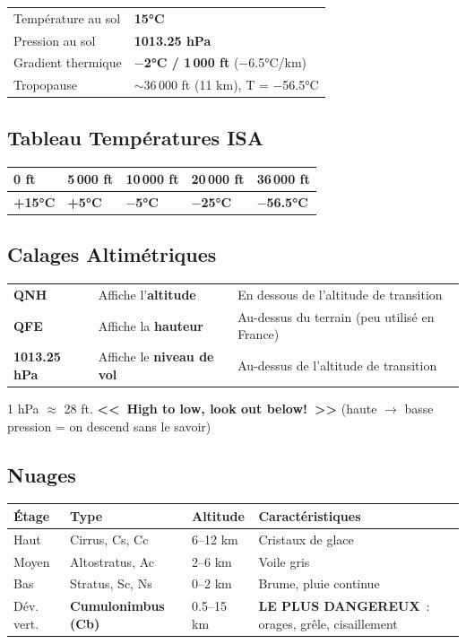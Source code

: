 \documentclass[11pt,a4paper]{article}
\begin{document}
\begin{tabular}{p{4cm}p{10.5cm}}
\toprule
Température au sol & \textbf{15°C} \\
Pression au sol & \textbf{1013.25 hPa} \\
Gradient thermique & \textbf{$-$2°C / 1\,000 ft} ($-$6.5°C/km) \\
Tropopause & $\sim$36\,000 ft (11 km), T = $-$56.5°C \\
\bottomrule
\end{tabular}

\subsection{Tableau Températures ISA}

\begin{tabular}{p{3cm}p{3cm}p{3cm}p{3cm}p{3cm}}
\toprule
0 ft & 5\,000 ft & 10\,000 ft & 20\,000 ft & 36\,000 ft \\
\midrule
\textbf{+15°C} & \textbf{+5°C} & \textbf{$-$5°C} & \textbf{$-$25°C} & \textbf{$-$56.5°C} \\
\bottomrule
\end{tabular}

\subsection{Calages Altimétriques}

\begin{tabular}{p{3cm}p{4cm}p{7.5cm}}
\toprule
\textbf{QNH} & Affiche l'\textbf{altitude} & En dessous de l'altitude de transition \\
\textbf{QFE} & Affiche la \textbf{hauteur} & Au-dessus du terrain (peu utilisé en France) \\
\textbf{1013.25 hPa} & Affiche le \textbf{niveau de vol} & Au-dessus de l'altitude de transition \\
\bottomrule
\end{tabular}

\begin{memobox}
1 hPa $\approx$ 28 ft. \textbf{<<~High to low, look out below!~>>} (haute $\to$ basse pression = on descend sans le savoir)
\end{memobox}

\subsection{Nuages}

\begin{tabular}{p{2cm}p{3cm}p{2cm}p{7cm}}
\toprule
\textbf{Étage} & \textbf{Type} & \textbf{Altitude} & \textbf{Caractéristiques} \\
\midrule
Haut & Cirrus, Cs, Cc & 6--12 km & Cristaux de glace \\
Moyen & Altostratus, Ac & 2--6 km & Voile gris \\
Bas & Stratus, Sc, Ns & 0--2 km & Brume, pluie continue \\
\rowcolor{warnred}
Dév. vert. & \textbf{Cumulonimbus (Cb)} & 0.5--15 km & \textbf{LE PLUS DANGEREUX}~: orages, grêle, cisaillement \\
\bottomrule
\end{tabular}
\end{document}
